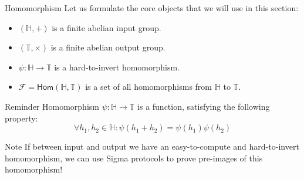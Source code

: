 \documentclass{zkdl-presentation-template}
\begin{document}
    \begin{frame}{Homomorphism}
        Let us formulate the core objects that we will use in this section:
        \begin{itemize}
            \item $(\mathbb{H}, +)$ is a finite abelian input group.
            \item $(\mathbb{T}, \times)$ is a finite abelian output group.
            \item $\psi: \mathbb{H} \to \mathbb{T}$ is a hard-to-invert homomorphism.
            \item $\mathcal{F} = \mathsf{Hom}(\mathbb{H}, \mathbb{T})$ is a set of all homomorphisms from $\mathbb{H}$ to $\mathbb{T}$.
        \end{itemize}

        \begin{block}{Reminder}
            Homomorphism $\psi: \mathbb{H} \to \mathbb{T}$ is a function, satisfying the following property:
            \begin{equation*}
                \forall h_1, h_2 \in \mathbb{H}: \psi(h_1 + h_2) = \psi(h_1)\psi(h_2)
            \end{equation*}
        \end{block}

        \begin{alertblock}{Note}
            If between input and output we have an easy-to-compute and hard-to-invert homomorphism, we can use Sigma protocols to prove pre-images of this homomorphism!
        \end{alertblock}
    \end{frame}
\end{document}
